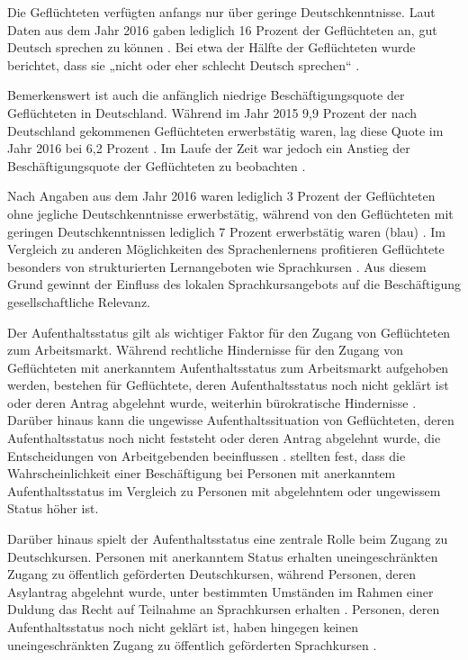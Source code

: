 Die Geflüchteten verfügten anfangs nur über geringe Deutschkenntnisse. Laut Daten aus dem Jahr 2016 gaben lediglich 16 Prozent der Geflüchteten an, gut Deutsch sprechen zu können \parencite[7]{brucker2018iab}. Bei etwa der Hälfte der Geflüchteten wurde berichtet, dass sie „nicht oder eher schlecht Deutsch sprechen“ \parencite[7]{brucker2018iab}.

Bemerkenswert ist auch die anfänglich niedrige Beschäftigungsquote der Geflüchteten in Deutschland. Während im Jahr 2015 9,9 Prozent der nach Deutschland gekommenen Geflüchteten erwerbstätig waren, lag diese Quote im Jahr 2016 bei 6,2 Prozent \parencite{brucker2017arbeitsmarktintegration}. Im Laufe der Zeit war jedoch ein Anstieg der Beschäftigungsquote der Geflüchteten zu beobachten \parencite{brucker2024institutionelle}.

Nach Angaben aus dem Jahr 2016 waren lediglich 3 Prozent der Geflüchteten ohne jegliche Deutschkenntnisse erwerbstätig, während von den Geflüchteten mit geringen Deutschkenntnissen lediglich 7 Prozent erwerbstätig waren (blau) \parencite[9]{sirries2017arbeitsmarktintegration}. Im Vergleich zu anderen Möglichkeiten des Sprachenlernens profitieren Geflüchtete besonders von strukturierten Lernangeboten wie Sprachkursen \parencite{kristen2022deutschkenntnisse}. Aus diesem Grund gewinnt der Einfluss des lokalen Sprachkursangebots auf die Beschäftigung gesellschaftliche Relevanz.

Der Aufenthaltsstatus gilt als wichtiger Faktor für den Zugang von Geflüchteten zum Arbeitsmarkt. Während rechtliche Hindernisse für den Zugang von Geflüchteten mit anerkanntem Aufenthaltsstatus zum Arbeitsmarkt aufgehoben werden, bestehen für Geflüchtete, deren Aufenthaltsstatus noch nicht geklärt ist oder deren Antrag abgelehnt wurde, weiterhin bürokratische Hindernisse \parencite[128--129]{kosyakova2020role}. Darüber hinaus kann die ungewisse Aufenthaltssituation von Geflüchteten, deren Aufenthaltsstatus noch nicht feststeht oder deren Antrag abgelehnt wurde, die Entscheidungen von Arbeitgebenden beeinflussen \parencite{kosyakova2020role}. \textcite{brucker2024institutionelle} stellten fest, dass die Wahrscheinlichkeit einer Beschäftigung bei Personen mit anerkanntem Aufenthaltsstatus im Vergleich zu Personen mit abgelehntem oder ungewissem Status höher ist.

Darüber hinaus spielt der Aufenthaltsstatus eine zentrale Rolle beim Zugang zu Deutschkursen. Personen mit anerkanntem Status erhalten uneingeschränkten Zugang zu öffentlich geförderten Deutschkursen, während Personen, deren Asylantrag abgelehnt wurde, unter bestimmten Umständen im Rahmen einer Duldung das Recht auf Teilnahme an Sprachkursen erhalten \parencite[129]{kosyakova2020role}. Personen, deren Aufenthaltsstatus noch nicht geklärt ist, haben hingegen keinen uneingeschränkten Zugang zu öffentlich geförderten Sprachkursen \parencite[12]{kosyakova2020role}.

